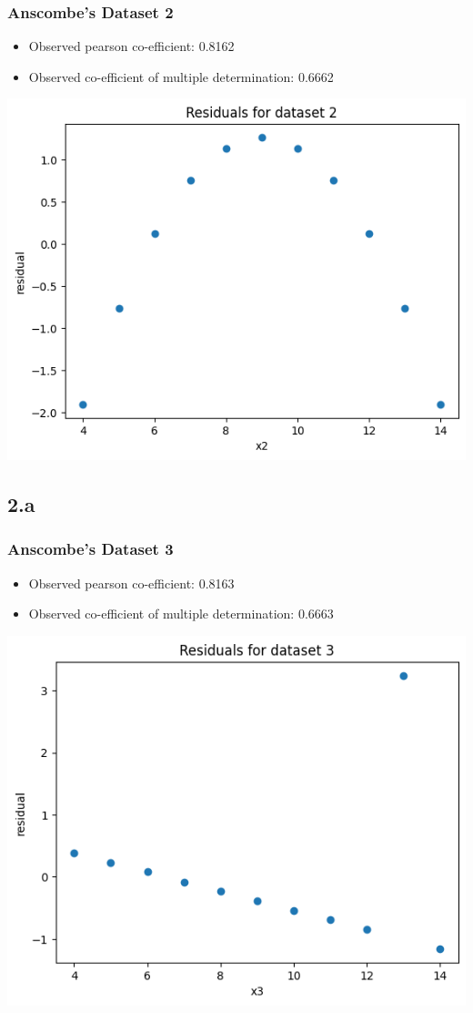 \documentclass[12pt]{article}
\begin{document}
\subsubsection*{Anscombe's Dataset 2}
\begin{itemize}
    \item Observed pearson co-efficient: 0.8162
    \item Observed co-efficient of multiple determination: 0.6662
\end{itemize}
\includegraphics*[width=\linewidth]{graph2a2}

\newpage
\subsection*{2.a}
\subsubsection*{Anscombe's Dataset 3}
\begin{itemize}
    \item Observed pearson co-efficient: 0.8163
    \item Observed co-efficient of multiple determination: 0.6663
\end{itemize}
\includegraphics*[width=\linewidth]{graph2a3}
\end{document}
